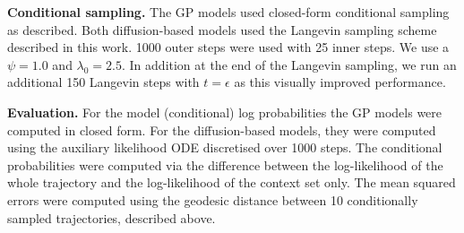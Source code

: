 \textbf{Conditional sampling. }
The GP models used closed-form conditional sampling as described.
Both diffusion-based models used the Langevin sampling scheme described in this work.
1000 outer steps were used with 25 inner steps.
We use a $\psi=1.0$ and $\lambda_0=2.5$.
In addition at the end of the Langevin sampling, we run an additional 150 Langevin steps with $t=\epsilon$ as this visually improved performance.

\textbf{Evaluation. }
For the model (conditional) log probabilities the GP models were computed in closed form.
For the diffusion-based models, they were computed using the auxiliary likelihood ODE discretised over 1000 steps.
The conditional probabilities were computed via the difference between the log-likelihood of the whole trajectory and the log-likelihood of the context set only.
The mean squared errors were computed using the geodesic distance between 10 conditionally sampled trajectories, described above.
